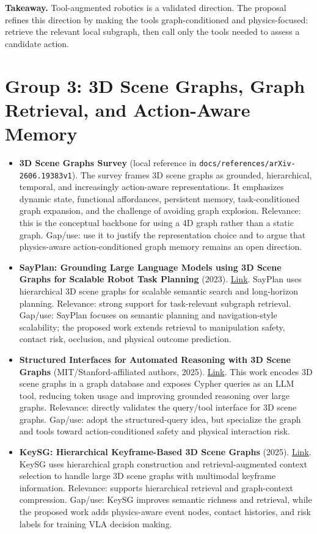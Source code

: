 \textbf{Takeaway.} Tool-augmented robotics is a validated direction. The proposal refines this direction by making the tools graph-conditioned and physics-focused: retrieve the relevant local subgraph, then call only the tools needed to assess a candidate action.

\section*{Group 3: 3D Scene Graphs, Graph Retrieval, and Action-Aware Memory}

\begin{itemize}
\item \textbf{3D Scene Graphs Survey} (local reference in \texttt{docs/references/arXiv-2606.19383v1}). The survey frames 3D scene graphs as grounded, hierarchical, temporal, and increasingly action-aware representations. It emphasizes dynamic state, functional affordances, persistent memory, task-conditioned graph expansion, and the challenge of avoiding graph explosion. Relevance: this is the conceptual backbone for using a 4D graph rather than a static graph. Gap/use: use it to justify the representation choice and to argue that physics-aware action-conditioned graph memory remains an open direction.

\item \textbf{SayPlan: Grounding Large Language Models using 3D Scene Graphs for Scalable Robot Task Planning} (2023). \href{https://arxiv.org/abs/2307.06135}{Link}. SayPlan uses hierarchical 3D scene graphs for scalable semantic search and long-horizon planning. Relevance: strong support for task-relevant subgraph retrieval. Gap/use: SayPlan focuses on semantic planning and navigation-style scalability; the proposed work extends retrieval to manipulation safety, contact risk, occlusion, and physical outcome prediction.

\item \textbf{Structured Interfaces for Automated Reasoning with 3D Scene Graphs} (MIT/Stanford-affiliated authors, 2025). \href{https://arxiv.org/abs/2510.16643}{Link}. This work encodes 3D scene graphs in a graph database and exposes Cypher queries as an LLM tool, reducing token usage and improving grounded reasoning over large graphs. Relevance: directly validates the query/tool interface for 3D scene graphs. Gap/use: adopt the structured-query idea, but specialize the graph and tools toward action-conditioned safety and physical interaction risk.

\item \textbf{KeySG: Hierarchical Keyframe-Based 3D Scene Graphs} (2025). \href{https://arxiv.org/abs/2510.01049}{Link}. KeySG uses hierarchical graph construction and retrieval-augmented context selection to handle large 3D scene graphs with multimodal keyframe information. Relevance: supports hierarchical retrieval and graph-context compression. Gap/use: KeySG improves semantic richness and retrieval, while the proposed work adds physics-aware event nodes, contact histories, and risk labels for training VLA decision making.


\end{itemize}
